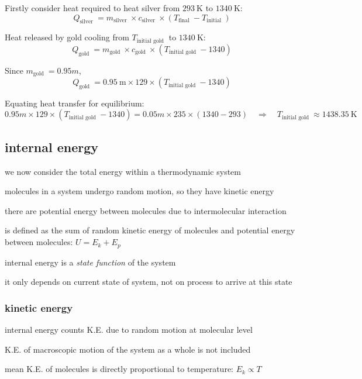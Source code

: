 \sol Firstly consider heat required to heat silver from $293 \mathrm{~K}$ to $1340 \mathrm{~K}$:
$$
Q_{\text {silver }}=m_{\text {silver }} \times c_{\text {silver }} \times\left(T_{\text {final }}-T_{\text {initial }}\right)
$$


Heat released by gold cooling from $T_{\text {initial gold }}$ to $1340 \mathrm{~K}$:
$$
Q_{\text {gold }}=m_{\text {gold }} \times c_{\text {gold }} \times\left(T_{\text {initial gold }}-1340\right)
$$

Since $m_{\text {gold }}=0.95 m$,
$$
Q_{\text {gold }}=0.95 \mathrm{~m} \times 129 \times\left(T_{\text {initial gold }}-1340\right)
$$


Equating heat transfer for equilibrium:
$$
0.95 m \times 129 \times\left(T_{\text {initial gold }}-1340\right)=0.05 m \times 235 \times(1340-293) \quad \Rightarrow \quad  T_{\text {initial gold }} \approx 1438.35 \mathrm{~K}
$$



\subsection{internal energy}

we now consider the total energy within a thermodynamic system

molecules in a system undergo random motion, so they have kinetic energy

there are potential energy between molecules due to intermolecular interaction

\begin{ilight}
	 is defined as the sum of random kinetic energy of molecules and potential energy between molecules: $\boxed{U=E_k+E_p}$
\end{ilight}

\cmt internal energy is a \emph{state function} of the system

it only depends on current state of system, not on process to arrive at this state

\subsubsection{kinetic energy}

\cmt internal energy counts K.E. due to random motion at molecular level

K.E. of macroscopic motion of the system as a whole is not included

\cmt mean K.E. of molecules is directly proportional to temperature: $\boxed{E_k \propto T}$


